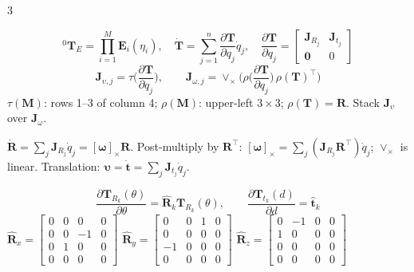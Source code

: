 \begin{multicols}{3}
\begin{fbx}
\[{}^0\mathbf T_E=\prod_{i=1}^{M}\mathbf E_i(\eta_i),\quad\dot{\mathbf T}=\sum_{j=1}^n\frac{\partial\mathbf T}{\partial q_j}\dot q_j,\quad\frac{\partial\mathbf T}{\partial q_j}=\begin{bmatrix}\mathbf J_{R_j}&\mathbf J_{t_j}\\\mathbf 0&0\end{bmatrix}\]
\[\mathbf J_{\upsilon,j}=\tau\Big(\frac{\partial\mathbf T}{\partial q_j}\Big),\qquad\mathbf J_{\omega,j}=\vee_\times\Big(\rho\Big(\frac{\partial\mathbf T}{\partial q_j}\Big)\,\rho(\mathbf T)^\top\Big)\]
$\tau(\mathbf M)$: rows 1--3 of column 4; $\rho(\mathbf M)$: upper-left $3\times3$; $\rho(\mathbf T)=\mathbf R$. Stack $\mathbf J_\upsilon$ over $\mathbf J_\omega$.
\end{fbx}
\begin{deriv}
$\dot{\mathbf R}=\sum_j\mathbf J_{R_j}\dot q_j=[\boldsymbol\omega]_\times\mathbf R$. Post-multiply by $\mathbf R^\top$: $[\boldsymbol\omega]_\times=\sum_j(\mathbf J_{R_j}\mathbf R^\top)\dot q_j$; $\vee_\times$ is linear. Translation: $\boldsymbol\upsilon=\dot{\mathbf t}=\sum_j\mathbf J_{t_j}\dot q_j$.
\end{deriv}
\begin{fbx}
\[\frac{\partial\mathbf T_{R_k}(\theta)}{\partial\theta}=\hat{\mathbf R}_k\mathbf T_{R_k}(\theta),\qquad\frac{\partial\mathbf T_{t_k}(d)}{\partial d}=\hat{\mathbf t}_k\]
{\footnotesize$\hat{\mathbf R}_x=\begin{bmatrix}0&0&0&0\\0&0&-1&0\\0&1&0&0\\0&0&0&0\end{bmatrix}$ $\hat{\mathbf R}_y=\begin{bmatrix}0&0&1&0\\0&0&0&0\\-1&0&0&0\\0&0&0&0\end{bmatrix}$ $\hat{\mathbf R}_z=\begin{bmatrix}0&-1&0&0\\1&0&0&0\\0&0&0&0\\0&0&0&0\end{bmatrix}$\\[2pt]
}
\end{fbx}
\end{multicols}
